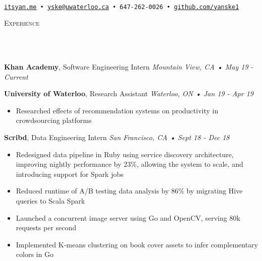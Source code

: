 \documentclass[a4paper, 11pt, hidelinks]{article}
\newcommand{\lineunder} {
    \vspace*{-8pt} \\
    \hrulefill \\
}
\newcommand{\header} [1] {
    {\hspace*{-4pt}\vspace*{6pt} \textsc{#1}}
    \vspace*{-6pt}
    \lineunder
    \vspace{6pt}
}
\begin{document}
\vspace*{-35pt}
\begin{center}
	\text{\fontsize{35}{40} \selectfont {Yan Ke}}\\
    \vspace{10pt}
    \texttt{\href{http://www.itsyan.me}{itsyan.me} • \href{mailto:yske@uwaterloo.ca}{yske@uwaterloo.ca} • 647-262-0026 •
    \href{http://www.github.com/yanske1}{github.com/yanske1}}
\end{center}
\vspace{-2pt}

\header{Experience}
\textbf{Khan Academy}, Software Engineering Intern \hfill\textit{Mountain View, CA • May 19 - Current}\\
\vspace{2mm}

\textbf{University of Waterloo}, Research Assistant \hfill\textit{Waterloo, ON • Jan 19 - Apr 19}\\
\vspace{-2mm}
\begin{itemize}[leftmargin=2em] \itemsep 1pt
	\item Researched effects of recommendation systems on productivity in crowdsourcing platforms
\end{itemize}

\textbf{Scribd}, Data Engineering Intern \hfill\textit{San Francisco, CA • Sept 18 - Dec 18}\\
\vspace{-2mm}
\begin{itemize}[leftmargin=2em] \itemsep 1pt
	\item Redesigned data pipeline in Ruby using service discovery architecture, improving nightly performance
    by 23\%, allowing the system to scale, and introducing support for Spark jobs
	\item Reduced runtime of A/B testing data analysis by 86\% by migrating Hive queries to Scala Spark
	\item Launched a concurrent image server using Go and OpenCV, serving 80k requests per second
	\item Implemented K-means clustering on book cover assets to infer complementary colors in Go
\end{itemize}
\end{document}
